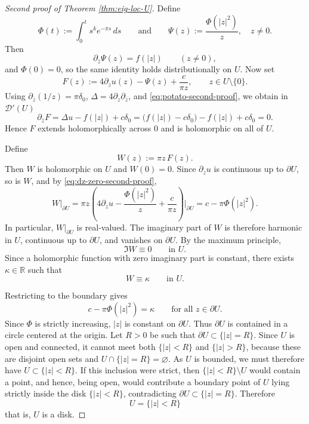 \documentclass[a4paper,11pt,reqno]{amsart}
\numberwithin{equation}{section}
\theoremstyle{plain} %
\theoremstyle{definition} %
\theoremstyle{remark}
\newcommand{\R}{\mathbb{R}}
\begin{document}
\begin{proof}[Second proof of Theorem \ref{thm:eig-loc-U}]
Define
\[
\Phi(t):=\int_0^t s^k e^{-\pi s}\,ds
\qquad\text{and}\qquad
\Psi(z):=\frac{\Phi(|z|^2)}{z},
\quad z\neq 0.
\]
Then
\[
\partial_{\bar z}\Psi(z)=f(|z|)
\qquad (z\neq 0),
\]
and \(\Phi(0)=0\), so the same identity holds distributionally on \(U\). Now set
\[
F(z):=4\partial_z u(z)-\Psi(z)+\frac{c}{\pi z},
\qquad z\in U\setminus\{0\}.
\]
Using \(\partial_{\bar z}(1/z)=\pi\delta_0\), \(\Delta=4\partial_z\partial_{\bar z}\), and
\eqref{eq:potato-second-proof}, we obtain in \(\mathcal D'(U)\)
\[
\partial_{\bar z}F
=
\Delta u-f(|z|)+c\delta_0
=
\bigl(f(|z|)-c\delta_0\bigr)-f(|z|)+c\delta_0
=0.
\]
Hence \(F\) extends holomorphically across \(0\) and is holomorphic on all of \(U\).

Define
\[
W(z):=\pi z\,F(z).
\]
Then \(W\) is holomorphic on \(U\) and \(W(0)=0\). Since \(\partial_z u\) is continuous up to
\(\partial U\), so is \(W\), and by \eqref{eq:dz-zero-second-proof},
\[
W|_{\partial U}
=
\pi z\left(4\partial_z u-\frac{\Phi(|z|^2)}{z}+\frac{c}{\pi z}\right)\Big|_{\partial U}
=
c-\pi\Phi(|z|^2).
\]
In particular, \(W|_{\partial U}\) is real-valued. The imaginary part of \(W\) is therefore
harmonic in \(U\), continuous up to \(\partial U\), and vanishes on \(\partial U\). By the
maximum principle,
\[
\Im W\equiv 0
\qquad\text{in }U.
\]
Since a holomorphic function with zero imaginary part is constant, there exists \(\kappa\in\R\)
such that
\[
W\equiv \kappa
\qquad\text{in }U.
\]

Restricting to the boundary gives
\[
c-\pi\Phi(|z|^2)=\kappa
\qquad\text{for all }z\in\partial U.
\]
Since \(\Phi\) is strictly increasing, \(|z|\) is constant on \(\partial U\). Thus
\(\partial U\) is contained in a circle centered at the origin. Let \(R>0\) be such that
\(\partial U\subset \{|z|=R\}\). Since \(U\) is open and connected, it cannot meet both
\(\{|z|<R\}\) and \(\{|z|>R\}\), because these are disjoint open sets and \(U\cap \{|z|=R\}=\varnothing\).
As \(U\) is bounded, we must therefore have \(U\subset \{|z|<R\}\). If this inclusion were strict,
then \(\{|z|<R\}\setminus U\) would contain a point, and hence, being open, would contribute a
boundary point of \(U\) lying strictly inside the disk \(\{|z|<R\}\), contradicting
\(\partial U\subset \{|z|=R\}\). Therefore
\[
U=\{|z|<R\}
\]
that is, \(U\) is a disk.
\end{proof}
\end{document}
